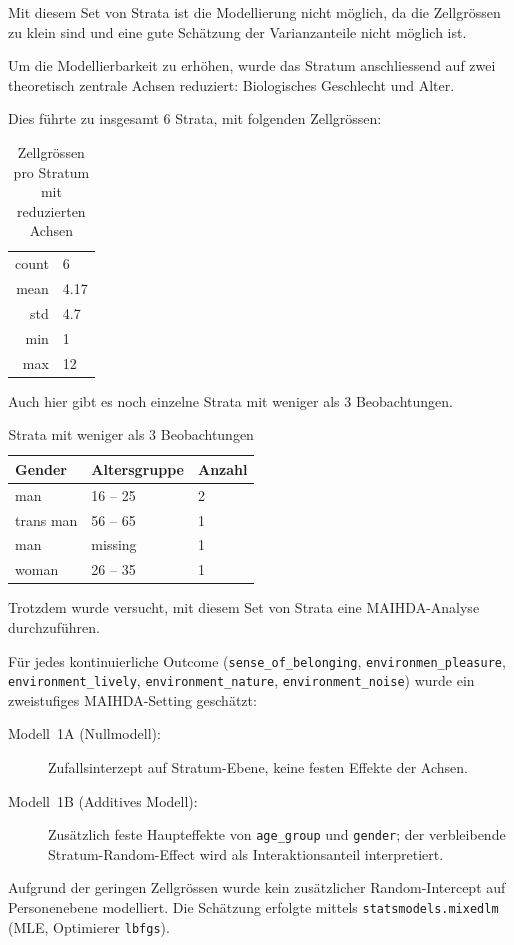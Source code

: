 Mit diesem Set von Strata ist die Modellierung nicht möglich, da die Zellgrössen zu klein sind und eine gute Schätzung der Varianzanteile nicht möglich ist.

Um die Modellierbarkeit zu erhöhen, wurde das Stratum anschliessend auf zwei theoretisch zentrale Achsen reduziert: Biologisches Geschlecht und Alter.

Dies führte zu insgesamt $6$ Strata, mit folgenden Zellgrössen:

\begin{table}[h]
    \centering
    \begin{tabular}{rl}
        count & 6 \\
        mean & 4.17 \\
        std & 4.7 \\
        min & 1 \\
        max & 12 \\
    \end{tabular}
    \caption{Zellgrössen pro Stratum mit reduzierten Achsen}
    \label{tab:zellgroessen_reduzierte_achsen}
\end{table}

Auch hier gibt es noch einzelne Strata mit weniger als 3 Beobachtungen.

\begin{table}[h]
    \centering
    \begin{tabular}{lll}
        Gender & Altersgruppe & Anzahl \\
        \hline
        man & 16 – 25 & 2 \\
        trans man & 56 – 65 & 1 \\
        man & missing & 1 \\
        woman & 26 – 35 & 1 \\
    \end{tabular}
    \caption{Strata mit weniger als 3 Beobachtungen}
    \label{tab:zellgroessen_reduzierte_achsen_kleine_strata}
\end{table}

Trotzdem wurde versucht, mit diesem Set von Strata eine MAIHDA-Analyse durchzuführen.

Für jedes kontinuierliche Outcome (\texttt{sense\_of\_belonging}, \texttt{environmen\_pleasure}, \texttt{environment\_lively}, \texttt{environment\_nature}, \texttt{environment\_noise}) wurde ein zweistufiges MAIHDA-Setting geschätzt:
\begin{description}
    \item[Modell~1A (Nullmodell):] Zufallsinterzept auf Stratum-Ebene, keine festen Effekte der Achsen.
    \item[Modell~1B (Additives Modell):] Zusätzlich feste Haupteffekte von \texttt{age\_group} und \texttt{gender}; der verbleibende Stratum-Random-Effect wird als Interaktionsanteil interpretiert.
\end{description}
Aufgrund der geringen Zellgrössen wurde kein zusätzlicher Random-Intercept auf Personenebene modelliert. Die Schätzung erfolgte mittels \texttt{statsmodels.mixedlm} (MLE, Optimierer \texttt{lbfgs}).


